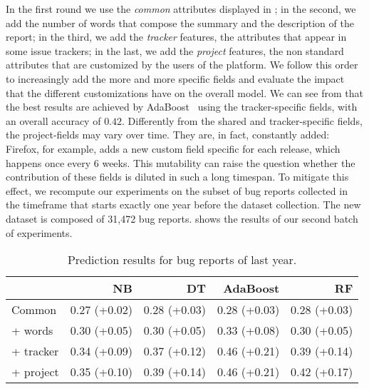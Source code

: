 In the first round we use the \emph{common} attributes displayed in ; in the second, we add the number of words that compose the summary and the description of the report; in the third, we add the \emph{tracker} features, \ie the attributes that appear in some issue trackers; in the last, we add the \emph{project} features, \ie the non standard attributes that are customized by the users of the platform. We follow this order to increasingly add the more and more specific fields and evaluate the impact that the different customizations have on the overall model. %
We can see from  that the best results are achieved by AdaBoost~\cite{bish2006} using the tracker-specific fields, with an overall accuracy of $0.42$. Differently from the shared and tracker-specific fields, the project-fields may vary over time. They are, in fact, constantly added: Firefox, for example, adds a new custom field specific for each release, which happens once every 6 weeks. This mutability can raise the question whether the contribution of these fields is diluted in such a long timespan. To mitigate this effect, we recompute our experiments on the subset of bug reports collected in the timeframe that starts exactly one year before the dataset collection. The new dataset is composed of 31,472 bug reports.  shows the results of our second batch of experiments. 

\begin{table}[ht]
\centering
\caption{Prediction results for bug reports of last year.}
\begin{tabular}{l|r|r|r|r}
 & \textbf{NB} & \textbf{DT} & \textbf{AdaBoost} & \textbf{RF} \\
 \hline 
Common & 0.27 (+0.02) & 0.28 (+0.03) & 0.28 (+0.03) & 0.28 (+0.03) \\
+ words & 0.30 (+0.05) & 0.30 (+0.05) & 0.33 (+0.08) & 0.30 (+0.05) \\
+ tracker & 0.34 (+0.09) & 0.37 (+0.12) & 0.46 (+0.21) & 0.39 (+0.14) \\
+ project & 0.35 (+0.10) & 0.39 (+0.14) & 0.46 (+0.21) & 0.42 (+0.17) \\
\hline

\end{tabular}
\label{tab:ml-results-fresh}
\end{table}

